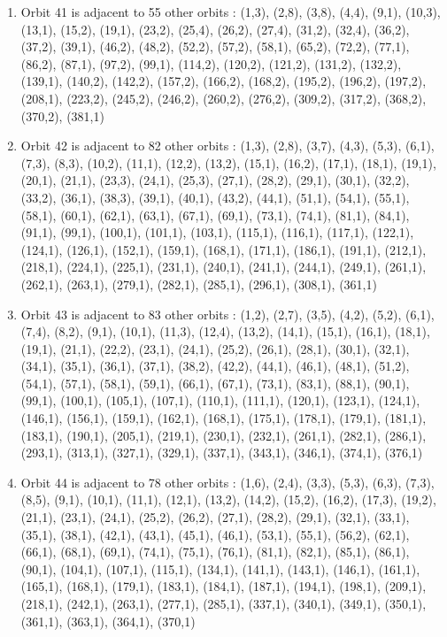\documentclass[12pt]{article}
\begin{document}
\begin{enumerate}
\item Orbit 41 is adjacent to 55 other orbits : (1,3), (2,8), (3,8), (4,4), (9,1), (10,3), (13,1), (15,2), (19,1), (23,2), (25,4), (26,2), (27,4), (31,2), (32,4), (36,2), (37,2), (39,1), (46,2), (48,2), (52,2), (57,2), (58,1), (65,2), (72,2), (77,1), (86,2), (87,1), (97,2), (99,1), (114,2), (120,2), (121,2), (131,2), (132,2), (139,1), (140,2), (142,2), (157,2), (166,2), (168,2), (195,2), (196,2), (197,2), (208,1), (223,2), (245,2), (246,2), (260,2), (276,2), (309,2), (317,2), (368,2), (370,2), (381,1)
\item Orbit 42 is adjacent to 82 other orbits : (1,3), (2,8), (3,7), (4,3), (5,3), (6,1), (7,3), (8,3), (10,2), (11,1), (12,2), (13,2), (15,1), (16,2), (17,1), (18,1), (19,1), (20,1), (21,1), (23,3), (24,1), (25,3), (27,1), (28,2), (29,1), (30,1), (32,2), (33,2), (36,1), (38,3), (39,1), (40,1), (43,2), (44,1), (51,1), (54,1), (55,1), (58,1), (60,1), (62,1), (63,1), (67,1), (69,1), (73,1), (74,1), (81,1), (84,1), (91,1), (99,1), (100,1), (101,1), (103,1), (115,1), (116,1), (117,1), (122,1), (124,1), (126,1), (152,1), (159,1), (168,1), (171,1), (186,1), (191,1), (212,1), (218,1), (224,1), (225,1), (231,1), (240,1), (241,1), (244,1), (249,1), (261,1), (262,1), (263,1), (279,1), (282,1), (285,1), (296,1), (308,1), (361,1)
\item Orbit 43 is adjacent to 83 other orbits : (1,2), (2,7), (3,5), (4,2), (5,2), (6,1), (7,4), (8,2), (9,1), (10,1), (11,3), (12,4), (13,2), (14,1), (15,1), (16,1), (18,1), (19,1), (21,1), (22,2), (23,1), (24,1), (25,2), (26,1), (28,1), (30,1), (32,1), (34,1), (35,1), (36,1), (37,1), (38,2), (42,2), (44,1), (46,1), (48,1), (51,2), (54,1), (57,1), (58,1), (59,1), (66,1), (67,1), (73,1), (83,1), (88,1), (90,1), (99,1), (100,1), (105,1), (107,1), (110,1), (111,1), (120,1), (123,1), (124,1), (146,1), (156,1), (159,1), (162,1), (168,1), (175,1), (178,1), (179,1), (181,1), (183,1), (190,1), (205,1), (219,1), (230,1), (232,1), (261,1), (282,1), (286,1), (293,1), (313,1), (327,1), (329,1), (337,1), (343,1), (346,1), (374,1), (376,1)
\item Orbit 44 is adjacent to 78 other orbits : (1,6), (2,4), (3,3), (5,3), (6,3), (7,3), (8,5), (9,1), (10,1), (11,1), (12,1), (13,2), (14,2), (15,2), (16,2), (17,3), (19,2), (21,1), (23,1), (24,1), (25,2), (26,2), (27,1), (28,2), (29,1), (32,1), (33,1), (35,1), (38,1), (42,1), (43,1), (45,1), (46,1), (53,1), (55,1), (56,2), (62,1), (66,1), (68,1), (69,1), (74,1), (75,1), (76,1), (81,1), (82,1), (85,1), (86,1), (90,1), (104,1), (107,1), (115,1), (134,1), (141,1), (143,1), (146,1), (161,1), (165,1), (168,1), (179,1), (183,1), (184,1), (187,1), (194,1), (198,1), (209,1), (218,1), (242,1), (263,1), (277,1), (285,1), (337,1), (340,1), (349,1), (350,1), (361,1), (363,1), (364,1), (370,1)

\end{enumerate}
\end{document}
